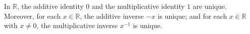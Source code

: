 In $\mathbb{R}$, the additive identity $0$ and the multiplicative identity $1$ are unique. Moreover, for each $x \in \mathbb{R}$, the additive inverse $-x$ is unique; and for each $x \in \mathbb{R}$ with $x \neq 0$, the multiplicative inverse $x^{-1}$ is unique.
